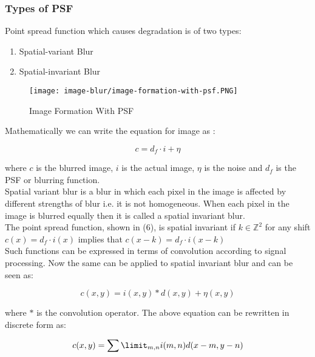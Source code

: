 \documentclass{article}
\begin{document}
\subsubsection{Types of PSF}
Point spread function which causes degradation is of two types: 
\begin{enumerate}
    \item Spatial-variant Blur
    \item Spatial-invariant Blur
\end{enumerate}

\begin{figure}[ht]
    \centering
    \texttt{[image: image-blur/image-formation-with-psf.PNG]}
    \caption{Image Formation With PSF}
    \label{fig:image-formation-psf}
\end{figure}

Mathematically we can write the equation for image as \cite{gonzalez-woods}:

\begin{equation}
    c = d_f \cdot i + \eta
    \label{6}
\end{equation}

where $c$ is the blurred image, $i$ is the actual image, $\eta$ is the noise and $d_f$ is the PSF or blurring function. \\

Spatial variant blur is a blur in which each pixel in the image is affected by different strengths of blur i.e. it is not homogeneous. When each pixel in the image is blurred equally then it is called a spatial invariant blur. \\

The point spread function, shown in (6), is spatial invariant if $k \in \mathbb{Z}^2$  for any shift $c(x) = d_f \cdot i(x)$ implies that $c(x - k) = d_f \cdot i(x - k)$ \\

Such functions can be expressed in terms of convolution according to signal processing. Now the same can be applied to spatial invariant blur and can be seen as: 

\begin{equation}
    c(x, y) = i(x, y) * d(x, y) + \eta(x, y)
\end{equation}

where $*$ is the convolution operator. The above equation can be rewritten in discrete form as:

\begin{equation}
    c(x, y) = \sum\limit_{m, n} i(m, n) d(x - m, y - n)
\end{equation}
\end{document}
